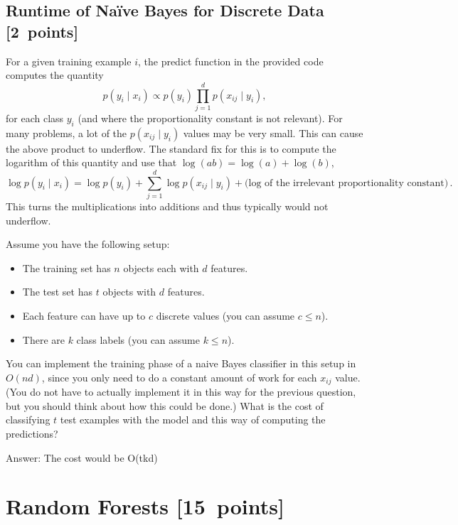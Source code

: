 \documentclass{article}
\newcommand{\blu}[1]{{\textcolor{blu}{#1}}}
\newcommand{\gre}[1]{\textcolor{gre}{#1}}
\newcommand\ans[1]{\par\gre{Answer: #1}}
\let\ask\blu
\newcommand\pts[1]{\textcolor{pointscolour}{[#1~points]}}
\begin{document}
    \clearpage
    \subsection{Runtime of Na\"ive Bayes for Discrete Data \pts{2}}

    For a given training example $i$, the predict function in the provided code computes the quantity
    \[
    p(y_i \mid x_i) \propto p(y_i)\prod_{j=1}^d p(x_{ij} \mid y_i),
    \]
    for each class $y_i$ (and where the proportionality constant is not relevant). For many problems, a lot of the $p(x_{ij} \mid y_i)$ values may be very small. This can cause the above product to underflow. The standard fix for this is to compute the logarithm of this quantity and use that $\log(ab) = \log(a)+\log(b)$,
    \[
    \log p(y_i \mid x_i) = \log p(y_i) + \sum_{j=1}^d \log p(x_{ij} \mid y_i) + \text{(log of the irrelevant proportionality constant)} \, .
    \]
    This turns the multiplications into additions and thus typically would not underflow.

    Assume you have the following setup:
    \begin{itemize}
        \item The training set has $n$ objects each with $d$ features.
        \item The test set has $t$ objects with $d$ features.
        \item Each feature can have up to $c$ discrete values (you can assume $c \leq n$).
        \item There are $k$ class labels (you can assume $k \leq n$).
    \end{itemize}
    You can implement the training phase of a naive Bayes classifier in this setup in $O(nd)$, since you only need to do a constant amount of work for each $x_{ij}$ value. (You do not have to actually implement it in this way for the previous question, but you should think about how this could be done.)
    \ask{What is the cost of classifying $t$ test examples with the model and this way of computing the predictions?}

    \ans{The cost would be O(tkd)}

    \clearpage
    \section{Random Forests \pts{15}}
\end{document}
